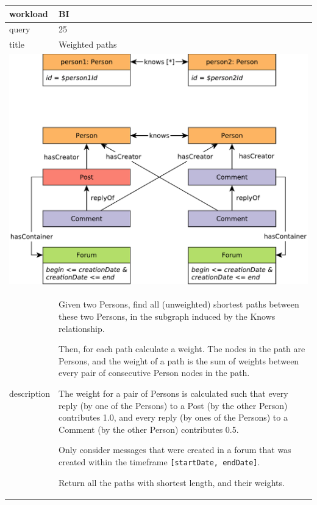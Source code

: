 \renewcommand*{\arraystretch}{1.1}

\noindent\begin{tabularx}{17cm}{|p{1.95cm}|X|}
	\hline
	workload    & BI \\ \hline
%
	query       & 25 \\ \hline
%
	title       & Weighted paths \\ \hline
	\multicolumn{2}{|c|}{ \includegraphics[scale=\patternscale,margin=0cm .2cm]{patterns/bi25}} \\ \hline
	description & Given two Persons, find all (unweighted) shortest paths between these
two Persons, in the subgraph induced by the Knows relationship.

Then, for each path calculate a weight. The nodes in the path are
Persons, and the weight of a path is the sum of weights between every
pair of consecutive Person nodes in the path.

The weight for a pair of Persons is calculated such that every reply (by
one of the Persons) to a Post (by the other Person) contributes 1.0, and
every reply (by ones of the Persons) to a Comment (by the other Person)
contributes 0.5.

Only consider messages that were created in a forum that was created
within the timeframe \texttt{{[}startDate,\ endDate{]}}.

Return all the paths with shortest length, and their weights.
 \\ \hline
	

\end{tabularx}
